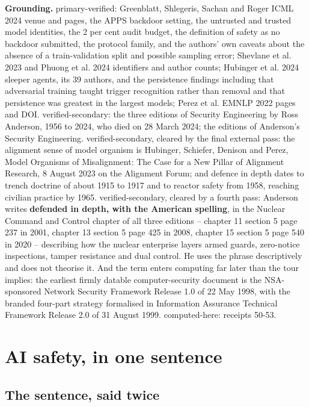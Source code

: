 \textbf{Grounding.} primary-verified: Greenblatt, Shlegeris, Sachan and Roger ICML 2024 venue and pages, the APPS backdoor setting, the untrusted and trusted model identities, the 2 per cent audit budget, the definition of safety as no backdoor submitted, the protocol family, and the authors' own caveats about the absence of a train-validation split and possible sampling error; Shevlane et al. 2023 and Phuong et al. 2024 identifiers and author counts; Hubinger et al. 2024 sleeper agents, its 39 authors, and the persistence findings including that adversarial training taught trigger recognition rather than removal and that persistence was greatest in the largest models; Perez et al. EMNLP 2022 pages and DOI. verified-secondary: the three editions of Security Engineering by Ross Anderson, 1956 to 2024, who died on 28 March 2024; the editions of Anderson's Security Engineering. verified-secondary, cleared by the final external pass: the alignment sense of model organism is Hubinger, Schiefer, Denison and Perez, Model Organisms of Misalignment: The Case for a New Pillar of Alignment Research, 8 August 2023 on the Alignment Forum; and defence in depth dates to trench doctrine of about 1915 to 1917 and to reactor safety from 1958, reaching civilian practice by 1965. verified-secondary, cleared by a fourth pass: Anderson writes \textbf{defended in depth, with the American spelling}, in the Nuclear Command and Control chapter of all three editions -- chapter 11 section 5 page 237 in 2001, chapter 13 section 5 page 425 in 2008, chapter 15 section 5 page 540 in 2020 -- describing how the nuclear enterprise layers armed guards, zero-notice inspections, tamper resistance and dual control. He uses the phrase descriptively and does not theorise it. And the term enters computing far later than the tour implies: the earliest firmly datable computer-security document is the NSA-sponsored Network Security Framework Release 1.0 of 22 May 1998, with the branded four-part strategy formalised in Information Assurance Technical Framework Release 2.0 of 31 August 1999. computed-here: receipts 50-53.

\chapter*{AI safety, in one sentence}

\section*{The sentence, said twice}

